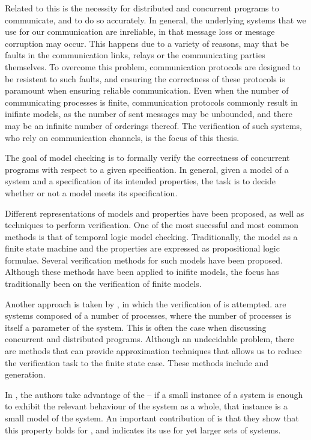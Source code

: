 Related to this is the necessity for distributed and concurrent programs to communicate, and to do so accurately. In general, the underlying systems that we use for our communication are inreliable, in that message loss or message corruption may occur. This happens due to a variety of reasons, may that be faults in the communication links, relays or the communicating parties themselves. To overcome this problem, communication protocols are designed to be resistent to such faults, and ensuring the correctness of these protocols is paramount when ensuring reliable communication. Even when the number of communicating processes is finite, communication protocols commonly result in inifinte models, as the number of sent messages may be unbounded, and there may be an infinite number of orderings thereof. The verification of such systems, who rely on communication channels, is the focus of this thesis.

The goal of model checking is to formally verify the correctness of concurrent
programs with respect to a given specification. In general, given a model of
a system and a specification of its intended properties, the task is to decide
whether or not a model meets its specification.

Different representations of models and properties have been proposed, as well as techniques to perform verification. One of the most sucessful and most common methods is that of temporal logic model checking. Traditionally, the model as a finite state machine and the properties are expressed as propositional logic formulae. Several verification methods for such models have been proposed. Although these methods have been applied to inifite models, the focus has traditionally been on the verification of finite models.

Another approach is taken by \cite{parosh}, in which the verification of  is attempted.  are systems composed of a number of processes, where the number of processes is itself a parameter of the system. This is often the case when discussing concurrent and distributed programs. Although an undecidable problem, there are methods that can provide approximation techniques that allows us to reduce the verification task to the finite state case. These methods include \cite{counterabstraction} and  generation\cite{invinv}. 

In \cite{parosh}, the authors take advantage of the  -- if a small instance of a system is enough to exhibit the relevant behaviour of the system as a whole, that instance is a small model of the system. An important contribution of \cite{parosh} is that they show that this property holds for , and indicates its use for yet larger sets of systems.

